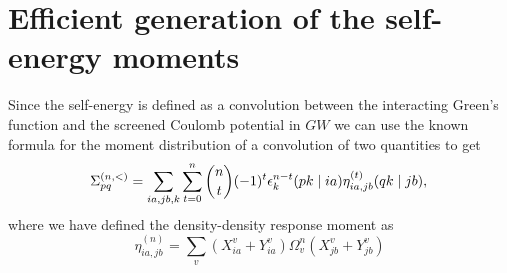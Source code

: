 \section{Efficient generation of the self-energy moments}
Since the self-energy is defined as a convolution between the interacting Green's function and the screened Coulomb potential in $GW$ we can use the known formula for the moment distribution of a convolution of two quantities to get
\begin{equation}
    \Sigma_{p q}^{(n,<)}=\sum_{i a, j b, k} \sum_{t=0}^n\binom{n}{t}(-1)^t \epsilon_k^{n-t}(p k \mid i a) \eta_{i a, j b}^{(t)}(q k \mid j b), \\
\end{equation}
where we have defined the density-density response moment as
\begin{equation}
   \eta_{i a, j b}^{(n)}=\sum_v\left(X_{i a}^v+Y_{i a}^v\right) \Omega_v^n\left(X_{j b}^v+Y_{j b}^v\right)
   \label{eqn:eta_def}
\end{equation}
